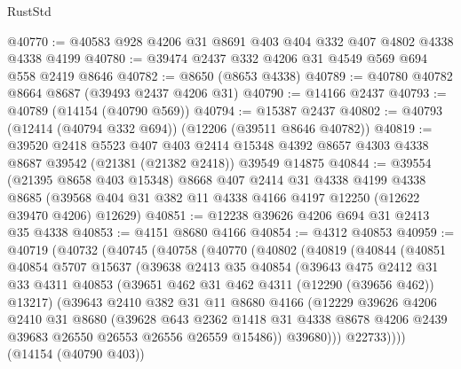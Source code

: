 \begin{lexlean}{RustStd}
\begin{coremodule}
@40770 := @40583 @928 @4206 @31 @8691 @403 @404 @332 @407 @4802 @4338 @4338 @4199
@40780 := @39474 @2437 @332 @4206 @31 @4549 @569 @694 @558 @2419 @8646
@40782 := @8650 (@8653 @4338)
@40789 := @40780 @40782 @8664 @8687 (@39493 @2437 @4206 @31)
@40790 := @14166 @2437
@40793 := @40789 (@14154 (@40790 @569))
@40794 := @15387 @2437
@40802 := @40793 (@12414 (@40794 @332 @694)) (@12206 (@39511 @8646 @40782))
@40819 := @39520
    @2418
    @5523
    @407
    @403
    @2414
    @15348
    @4392
    @8657
    @4303
    @4338
    @8687
    @39542
    (@21381 (@21382 @2418))
    @39549
    @14875
@40844 := @39554
    (@21395 @8658 @403 @15348)
    @8668
    @407
    @2414
    @31
    @4338
    @4199
    @4338
    @8685
    (@39568 @404 @31 @382 @11 @4338 @4166 @4197 @12250 (@12622 @39470 @4206) @12629)
@40851 := @12238 @39626 @4206 @694 @31 @2413 @35 @4338
@40853 := @4151 @8680 @4166
@40854 := @4312 @40853
@40959 := @40719
    (@40732
      (@40745
        (@40758
          (@40770
            (@40802
              (@40819
                (@40844
                  (@40851
                    @40854
                    @5707
                    @15637
                    (@39638
                      @2413
                      @35
                      @40854
                      (@39643
                        @475
                        @2412
                        @31
                        @33
                        @4311
                        @40853
                        (@39651 @462 @31 @462 @4311 (@12290 (@39656 @462)) @13217)
                        (@39643
                          @2410
                          @382
                          @31
                          @11
                          @8680
                          @4166
                          (@12229
                            @39626
                            @4206
                            @2410
                            @31
                            @8680
                            (@39628
                              @643
                              @2362
                              @1418
                              @31
                              @4338
                              @8678
                              @4206
                              @2439
                              @39683
                              @26550
                              @26553
                              @26556
                              @26559
                              @15486))
                          @39680)))
                    @22733))))
            (@14154 (@40790 @403))

\end{coremodule}
\end{lexlean}
